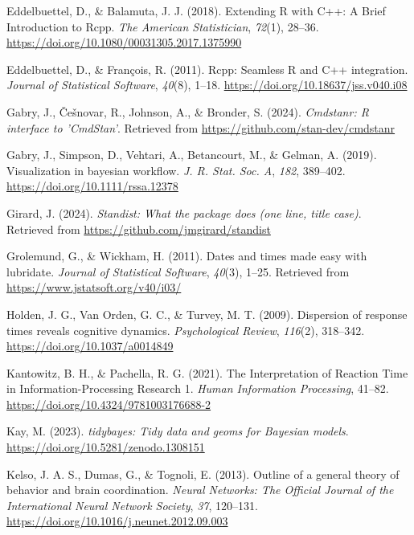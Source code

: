 \documentclass[
  man,floatsintext]{apa6}
\newlength{\cslhangindent}
\newenvironment{CSLReferences}[2] %
 {\begin{list}{}{%
  \setlength{\itemindent}{0pt}
  \setlength{\leftmargin}{0pt}
  \setlength{\parsep}{0pt}
  \ifodd #1
   \setlength{\leftmargin}{\cslhangindent}
   \setlength{\itemindent}{-1\cslhangindent}
  \fi
  \setlength{\itemsep}{#2\baselineskip}}}
 {\end{list}}
\begin{document}
\begin{CSLReferences}{1}{0}
Eddelbuettel, D., \& Balamuta, J. J. (2018). {Extending {R} with {C++}: A Brief Introduction to {Rcpp}}. \emph{The American Statistician}, \emph{72}(1), 28--36. \url{https://doi.org/10.1080/00031305.2017.1375990}

Eddelbuettel, D., \& François, R. (2011). {Rcpp}: Seamless {R} and {C++} integration. \emph{Journal of Statistical Software}, \emph{40}(8), 1--18. \url{https://doi.org/10.18637/jss.v040.i08}

Gabry, J., Češnovar, R., Johnson, A., \& Bronder, S. (2024). \emph{Cmdstanr: R interface to 'CmdStan'}. Retrieved from \url{https://github.com/stan-dev/cmdstanr}

Gabry, J., Simpson, D., Vehtari, A., Betancourt, M., \& Gelman, A. (2019). Visualization in bayesian workflow. \emph{J. R. Stat. Soc. A}, \emph{182}, 389--402. \url{https://doi.org/10.1111/rssa.12378}

Girard, J. (2024). \emph{Standist: What the package does (one line, title case)}. Retrieved from \url{https://github.com/jmgirard/standist}

Grolemund, G., \& Wickham, H. (2011). Dates and times made easy with {lubridate}. \emph{Journal of Statistical Software}, \emph{40}(3), 1--25. Retrieved from \url{https://www.jstatsoft.org/v40/i03/}

Holden, J. G., Van Orden, G. C., \& Turvey, M. T. (2009). Dispersion of response times reveals cognitive dynamics. \emph{Psychological Review}, \emph{116}(2), 318--342. \url{https://doi.org/10.1037/a0014849}

Kantowitz, B. H., \& Pachella, R. G. (2021). The {Interpretation} of {Reaction Time} in {Information-Processing Research} 1. \emph{Human Information Processing}, 41--82. \url{https://doi.org/10.4324/9781003176688-2}

Kay, M. (2023). \emph{{tidybayes}: Tidy data and geoms for {Bayesian} models}. \url{https://doi.org/10.5281/zenodo.1308151}

Kelso, J. A. S., Dumas, G., \& Tognoli, E. (2013). Outline of a general theory of behavior and brain coordination. \emph{Neural Networks: The Official Journal of the International Neural Network Society}, \emph{37}, 120--131. \url{https://doi.org/10.1016/j.neunet.2012.09.003}


\end{CSLReferences}
\end{document}
